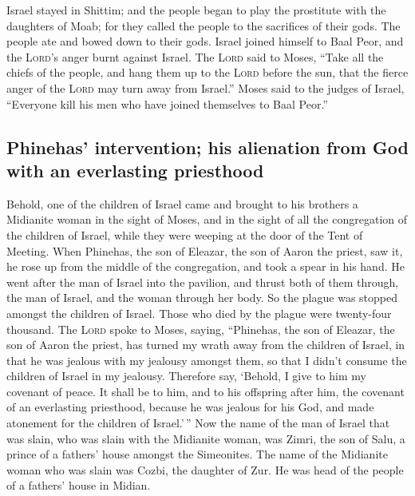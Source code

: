  Israel stayed in Shittim; and the people began to play
the prostitute with the daughters of Moab;  for they
called the people to the sacrifices of their gods. The people ate and
bowed down to their gods.  Israel joined himself to Baal
Peor, and the \textsc{Lord}'s anger burnt against Israel. 
The \textsc{Lord} said to Moses, ``Take all the chiefs of the people,
and hang them up to the \textsc{Lord} before the sun, that the fierce
anger of the \textsc{Lord} may turn away from Israel.'' 
Moses said to the judges of Israel, ``Everyone kill his men who have
joined themselves to Baal Peor.''

\hypertarget{phinehas-intervention-his-alienation-from-god-with-an-everlasting-priesthood}{%
\subsection{Phinehas' intervention; his alienation from God with an
everlasting
priesthood}\label{phinehas-intervention-his-alienation-from-god-with-an-everlasting-priesthood}}

 Behold, one of the children of Israel came and brought to
his brothers a Midianite woman in the sight of Moses, and in the sight
of all the congregation of the children of Israel, while they were
weeping at the door of the Tent of Meeting.  When
Phinehas, the son of Eleazar, the son of Aaron the priest, saw it, he
rose up from the middle of the congregation, and took a spear in his
hand.  He went after the man of Israel into the pavilion,
and thrust both of them through, the man of Israel, and the woman
through her body. So the plague was stopped amongst the children of
Israel.  Those who died by the plague were twenty-four
thousand.  The \textsc{Lord} spoke to Moses, saying,
 ``Phinehas, the son of Eleazar, the son of Aaron the
priest, has turned my wrath away from the children of Israel, in that he
was jealous with my jealousy amongst them, so that I didn't consume the
children of Israel in my jealousy.  Therefore say,
`Behold, I give to him my covenant of peace.  It shall be
to him, and to his offspring after him, the covenant of an everlasting
priesthood, because he was jealous for his God, and made atonement for
the children of Israel.'\,''  Now the name of the man of
Israel that was slain, who was slain with the Midianite woman, was
Zimri, the son of Salu, a prince of a fathers' house amongst the
Simeonites.  The name of the Midianite woman who was
slain was Cozbi, the daughter of Zur. He was head of the people of a
fathers' house in Midian.

